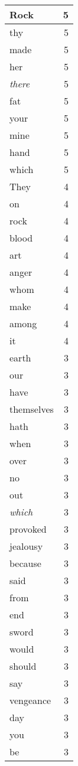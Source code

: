 \begin{center}
\begin{longtable}{l|r}
Rock & 5 \\ \hline
thy & 5 \\ \hline
made & 5 \\ \hline
her & 5 \\ \hline
\emph{there} & 5 \\ \hline
fat & 5 \\ \hline
your & 5 \\ \hline
mine & 5 \\ \hline
hand & 5 \\ \hline
which & 5 \\ \hline
They & 4 \\ \hline
on & 4 \\ \hline
rock & 4 \\ \hline
blood & 4 \\ \hline
art & 4 \\ \hline
anger & 4 \\ \hline
whom & 4 \\ \hline
make & 4 \\ \hline
among & 4 \\ \hline
it & 4 \\ \hline
earth & 3 \\ \hline
our & 3 \\ \hline
have & 3 \\ \hline
themselves & 3 \\ \hline
hath & 3 \\ \hline
when & 3 \\ \hline
over & 3 \\ \hline
no & 3 \\ \hline
out & 3 \\ \hline
\emph{which} & 3 \\ \hline
provoked & 3 \\ \hline
jealousy & 3 \\ \hline
because & 3 \\ \hline
said & 3 \\ \hline
from & 3 \\ \hline
end & 3 \\ \hline
sword & 3 \\ \hline
would & 3 \\ \hline
should & 3 \\ \hline
say & 3 \\ \hline
vengeance & 3 \\ \hline
day & 3 \\ \hline
you & 3 \\ \hline
be & 3 \\ \hline

\end{longtable}
\end{center}
